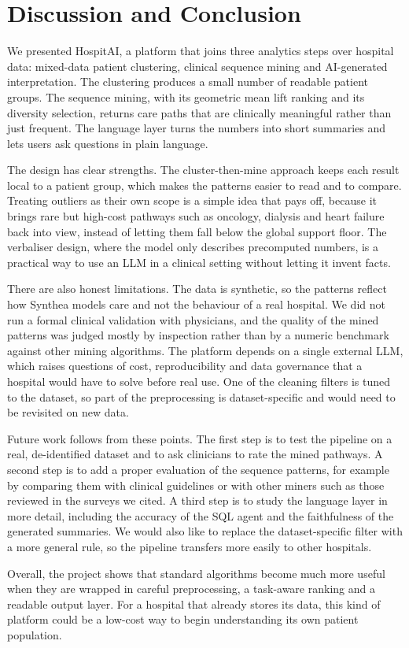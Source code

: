 
\section{Discussion and Conclusion}
\label{sec:conclusion}

We presented HospitAI, a platform that joins three analytics steps over hospital data: mixed-data patient clustering, clinical sequence mining and AI-generated interpretation. The clustering produces a small number of readable patient groups. The sequence mining, with its geometric mean lift ranking and its diversity selection, returns care paths that are clinically meaningful rather than just frequent. The language layer turns the numbers into short summaries and lets users ask questions in plain language.

The design has clear strengths. The cluster-then-mine approach keeps each result local to a patient group, which makes the patterns easier to read and to compare. Treating outliers as their own scope is a simple idea that pays off, because it brings rare but high-cost pathways such as oncology, dialysis and heart failure back into view, instead of letting them fall below the global support floor. The verbaliser design, where the model only describes precomputed numbers, is a practical way to use an LLM in a clinical setting without letting it invent facts.

There are also honest limitations. The data is synthetic, so the patterns reflect how Synthea models care and not the behaviour of a real hospital. We did not run a formal clinical validation with physicians, and the quality of the mined patterns was judged mostly by inspection rather than by a numeric benchmark against other mining algorithms. The platform depends on a single external LLM, which raises questions of cost, reproducibility and data governance that a hospital would have to solve before real use. One of the cleaning filters is tuned to the dataset, so part of the preprocessing is dataset-specific and would need to be revisited on new data.

Future work follows from these points. The first step is to test the pipeline on a real, de-identified dataset and to ask clinicians to rate the mined pathways. A second step is to add a proper evaluation of the sequence patterns, for example by comparing them with clinical guidelines or with other miners such as those reviewed in the surveys we cited. A third step is to study the language layer in more detail, including the accuracy of the SQL agent and the faithfulness of the generated summaries. We would also like to replace the dataset-specific filter with a more general rule, so the pipeline transfers more easily to other hospitals.

Overall, the project shows that standard algorithms become much more useful when they are wrapped in careful preprocessing, a task-aware ranking and a readable output layer. For a hospital that already stores its data, this kind of platform could be a low-cost way to begin understanding its own patient population.
